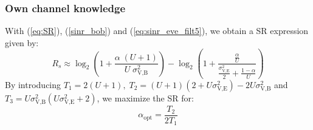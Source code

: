 \documentclass[journal,comsoc]{IEEEtran}
\begin{document}
\subsubsection{Own channel knowledge}
With (\ref{eq:SR}), (\ref{sinr_bob}) and (\ref{eq:sinr_eve_filt5}), we obtain a SR expression given by:
\begin{equation}
R_s \approx \log_2 \left( 1 +  \frac{\alpha \;(U+1)}{U \; \sigma_{\text{V,B}}^2} \right) - \log_2\left( 1 +  \frac{\frac{\alpha }{U}}{\frac{\sigma^2_{\text{V,E}}}{2} + \frac{1-\alpha}{U}}\right)
\label{eq:SR_anal2_decod_5}
\end{equation}
By introducing $T_1=2(U+1),  \; T_2 = (U+1)(2+U\sigma_{\text{V,E}}^2) - 2U\sigma_{\text{V,B}}^2 $ and $T_3 = U\sigma_{\text{V,B}}^2(U\sigma_{\text{V,E}}^2+2)$, we maximize the SR for:
\begin{equation}
\alpha_{\text{opt}} = \frac{T_2}{2T_1}
\label{eq:optimal_alpha_decod_5}
\end{equation}


\end{document}
